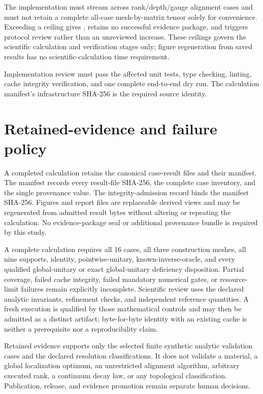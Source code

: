 \documentclass[11pt]{article}
\begin{document}
The implementation must stream across rank/depth/gauge alignment cases and must not retain a
complete all-case mesh-by-matrix tensor solely for convenience. Exceeding a ceiling gives
, retains no successful evidence package, and triggers protocol
review rather than an unreviewed increase. These ceilings govern the scientific
calculation and verification stages only; figure regeneration from saved results has no
scientific-calculation time requirement.

Implementation review must pass the affected unit tests, type checking, linting, cache
integrity verification, and one complete end-to-end dry run. The calculation manifest's
infrastructure SHA-256 is the required source identity.

\section{Retained-evidence and failure policy}

A completed calculation retains the canonical case-result files and their manifest. The
manifest records every result-file SHA-256, the complete case inventory, and the single
 provenance value. The integrity-admission record
binds the manifest SHA-256. Figures and report files are replaceable derived views and may
be regenerated from admitted result bytes without altering or repeating the calculation.
No evidence-package seal or additional provenance bundle is required by this study.

A complete calculation requires all 16 cases, all three construction meshes, all nine
supports, identity, pointwise-unitary, known-inverse-oracle, and every qualified
global-unitary or exact global-unitary deficiency disposition. Partial coverage, failed
cache integrity, failed mandatory numerical gates, or resource-limit failures remain
explicitly incomplete. Scientific review uses the declared analytic invariants, refinement checks, and
independent reference quantities. A fresh execution is qualified by those mathematical
controls and may then be admitted as a distinct artifact; byte-for-byte identity with an
existing cache is neither a prerequisite nor a reproducibility claim.

Retained evidence supports only the selected finite synthetic analytic validation cases and the declared
resolution classifications. It does not validate a material, a global localization
optimum, an unrestricted alignment algorithm, arbitrary executed rank, a continuum decay
law, or any topological classification. Publication, release, and evidence promotion
remain separate human decisions.
\end{document}
